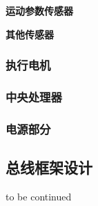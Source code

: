 \textbf{运动参数传感器}

\textbf{其他传感器}

\subsubsection{执行电机}

\subsubsection{中央处理器}

\subsubsection{电源部分}

\subsection{总线框架设计}



to be continued